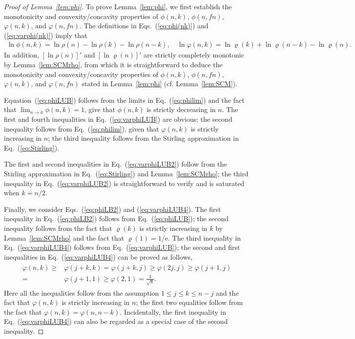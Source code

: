 \documentclass[aop]{imsart}
\theoremstyle{plain}
\theoremstyle{remark}
\newcommand{\rme}{\mathrm{e}}
\newcommand{\1}{\operatorname{\uppercase\expandafter{\romannumeral1}}}
\newcommand{\2}{\operatorname{\uppercase\expandafter{\romannumeral2}}}
\newcommand{\3}{\operatorname{\uppercase\expandafter{\romannumeral3}}}
\newcommand{\4}{\operatorname{\uppercase\expandafter{\romannumeral4}}}
\newcommand{\5}{\operatorname{\uppercase\expandafter{\romannumeral5}}}
\newcommand{\6}{\operatorname{\uppercase\expandafter{\romannumeral6}}}
\newcommand{\7}{\operatorname{\uppercase\expandafter{\romannumeral7}}}
\newcommand{\8}{\operatorname{\uppercase\expandafter{\romannumeral8}}}
\newcommand{\9}{\operatorname{\uppercase\expandafter{\romannumeral9}}}
\newcommand{\eref}[1]{Eq.~\textup{(\ref{#1})}}
\newcommand{\Eref}[1]{Equation~\textup{(\ref{#1})}}
\newcommand{\eqsref}[2]{Eqs.~(\ref{#1}) and (\ref{#2})}
\newcommand{\lref}[1]{Lemma~\ref{#1}}
\begin{document}
\begin{proof}[Proof of \lref{lem:phi}]
	To prove \lref{lem:phi}, we first establish the monotonicity and convexity/concavity properties of $\phi(n,k)$, $\phi(n,f n)$, $\varphi(n,k)$, and $\varphi(n,f n)$. 
	The definitions in  \eqsref{eq:phi(nk)}{eq:varphi(nk)} imply that
	\begin{align}
	\ln \phi(n,k)=\ln \rho(n)-\ln \rho(k)-\ln \rho(n-k),\quad \ln \varphi(n,k)=\ln \varrho(k)+\ln \varrho(n-k)-\ln \varrho(n). \label{eq:phi(nk)Proof}
	\end{align}
	In addition,  $[\ln\rho(n)]'$ and  $[\ln\varrho(n)]'$ are strictly  completely monotonic by \lref{lem:SCMrho}, from  which it is straightforward to  deduce  
	the monotonicity and convexity/concavity properties of $\phi(n,k)$, $\phi(n,f n)$, $\varphi(n,k)$, and $\varphi(n,f n)$ stated in \lref{lem:phi} (cf. \lref{lem:SCM}). 
	
    \Eref{eq:phiLUB} follows from the limits in  \eref{eq:philim} and the fact that  $\lim_{n\to k}\phi(n,k)=1$, give that $\phi(n,k)$ is strictly decreasing in $n$. The first and fourth inequalities in  \eref{eq:varphiLUB} are obvious; the second inequality   
follows from \eref{eq:philim}, given that $\varphi(n,k)$ is strictly increasing in $n$; the third inequality follows from the Stirling approximation in \eref{eq:Stirling}.


	
	The first  and second inequalities in \eref{eq:varphiLUB2}  follow from the Stirling approximation in \eref{eq:Stirling} and \lref{lem:SCMrho}; 
	the third inequality in  \eref{eq:varphiLUB2}  is straightforward to verify and is saturated when $k=n/2$.

	
	Finally, we consider \eqsref{eq:phiLB2}{eq:varphiLUB4}. 
	The first inequality in \eref{eq:phiLB2} follows from
 \eref{eq:phiLUB};	the second inequality follows from the fact that $\varrho(k)$ is strictly increasing in $k$ by \lref{lem:SCMrho} and the fact that $\varrho(1)=1/\rme$. The third  inequality in  \eref{eq:varphiLUB4} follows from \eref{eq:varphiLUB}; the second and first inequalities  in \eref{eq:varphiLUB4} can be proved as follows,
	\begin{align}
\begin{split}
	\varphi(n,k)\geq &\varphi(j+k,k)= \varphi(j+k,j)\geq  \varphi(2j,j)\geq \varphi(j+1,j)\\
	=&
	\varphi(j+1,1)\geq \varphi(2,1)=
	\frac{1}{\sqrt{8}}.
\end{split}
	\end{align}
	Here all the inequalities follow from the assumption $1\leq j\leq k\leq n-j$ and the fact that $\varphi(n,k)$ is strictly increasing in $n$; the first two equalities follow from the fact that $	\varphi(n,k)=	\varphi(n,n-k)$. Incidentally, the first inequality  in \eref{eq:varphiLUB4} can also be regarded as a special case of the second inequality.
\end{proof}
\end{document}
